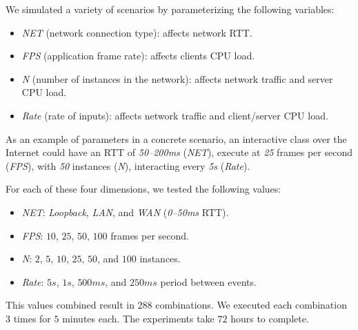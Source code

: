 \documentclass[sigplan,screen]{acmart}
\begin{document}
We simulated a variety of scenarios by parameterizing the following variables:
%
\begin{itemize}
\item \emph{NET} (network connection type):
    affects network RTT.
\item \emph{FPS} (application frame rate):
    affects clients CPU load.
\item \emph{N} (number of instances in the network):
    affects network traffic and server CPU load.
\item \emph{Rate} (rate of inputs):
    affects network traffic and client/server CPU load.
\end{itemize}
%

As an example of parameters in a concrete scenario, an interactive class over
the Internet could have
    an RTT of \emph{50--200ms} (\emph{NET}),
    execute at \emph{25} frames per second (\emph{FPS}),
    with \emph{50} instances (\emph{N}),
    interacting every \emph{5s} (\emph{Rate}).

For each of these four dimensions, we tested the following values:
%
\begin{itemize}
\item \emph{NET}: \emph{Loopback}, \emph{LAN}, and \emph{WAN} (\emph{0--50ms} RTT).
\item \emph{FPS}: $10$, $25$, $50$, $100$ frames per second.     %
\item \emph{N}: $2$, $5$, $10$, $25$, $50$, and $100$ instances. %
\item \emph{Rate}: $5s$, $1s$, $500ms$, and $250ms$ period between events.
\end{itemize}                                                    %
%
This values combined result in $288$ combinations.
We executed each combination $3$ times for $5$ minutes each.
The experiments take $72$ hours to complete.
\end{document}
